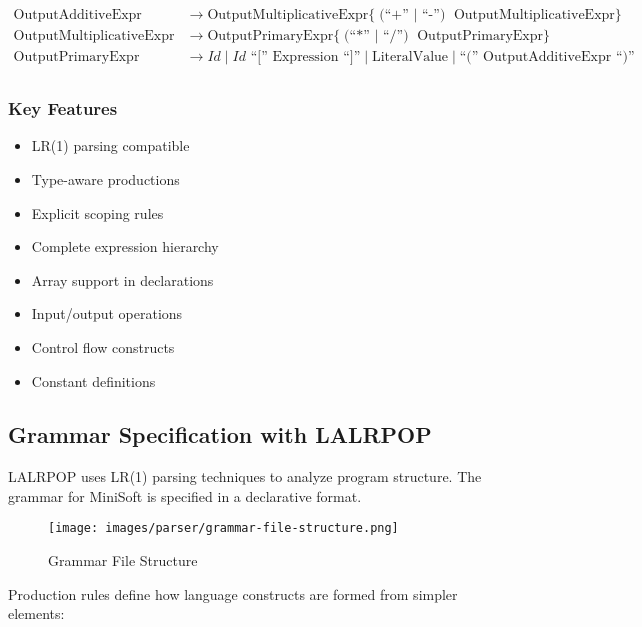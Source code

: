 \documentclass[12pt,a4paper]{article}
\begin{document}
\[\begin{array}{rl}
		\text{OutputAdditiveExpr}       & \rightarrow \text{OutputMultiplicativeExpr} \{ \text{(``+'' $\mid$ ``-'') } \text{OutputMultiplicativeExpr} \}                                                              \\

		\text{OutputMultiplicativeExpr} & \rightarrow \text{OutputPrimaryExpr} \{ \text{(``*'' $\mid$ ``/'') } \text{OutputPrimaryExpr} \}                                                                            \\

		\text{OutputPrimaryExpr}        & \rightarrow \mathit{Id} \mid \mathit{Id} \text{ ``['' } \text{Expression} \text{ ``]''} \mid \text{LiteralValue} \mid \text{``('' } \text{OutputAdditiveExpr} \text{ ``)''} \\
	\end{array}
\]
\normalsize

\subsubsection*{Key Features}
\begin{itemize}
	\item LR(1) parsing compatible
	\item Type-aware productions
	\item Explicit scoping rules
	\item Complete expression hierarchy
	\item Array support in declarations
	\item Input/output operations
	\item Control flow constructs
	\item Constant definitions
\end{itemize}


\subsection{Grammar Specification with LALRPOP}
LALRPOP uses LR(1) parsing techniques to analyze program structure. The grammar for MiniSoft is specified in a declarative format.


\begin{figure}[H]
	\centering
	\texttt{[image: images/parser/grammar-file-structure.png]}
	\caption{Grammar File Structure}
\end{figure}

Production rules define how language constructs are formed from simpler elements:
\end{document}
